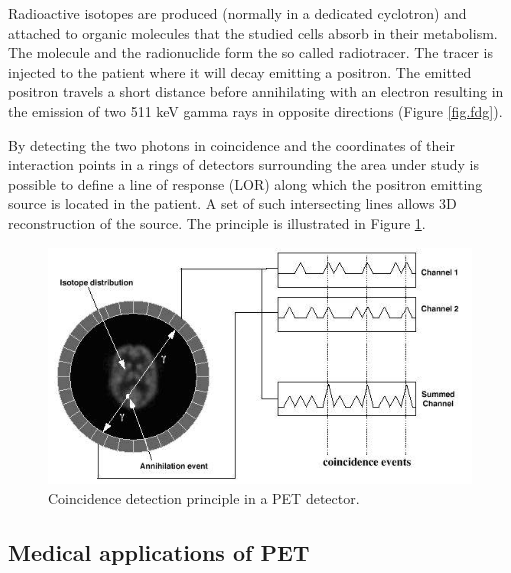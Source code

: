 Radioactive isotopes are produced (normally in a dedicated cyclotron) and attached to organic molecules that the studied cells absorb in their metabolism. The molecule and the radionuclide form the so called radiotracer. The tracer is injected to the patient where it will decay emitting a positron. The emitted positron travels a short distance before annihilating with an electron resulting in the emission of two 511 keV gamma rays in opposite directions (Figure \ref{fig.fdg}).

By detecting the two photons in coincidence and the coordinates of their interaction points in a rings of detectors surrounding the area under study is possible to define a line of response (LOR) along which the positron emitting source is located in the patient. A set of such intersecting lines allows 3D reconstruction of the source. The principle is illustrated in Figure \ref{fig.pet}.

\begin{figure}[!bthp]
	\centering
	\includegraphics[scale=1.0]{img/MAPD_coincidenceprinciple.jpg}
	\caption{\label{fig.pet} Coincidence detection principle in a PET detector.}
\end{figure}

\subsection{Medical applications of PET}

